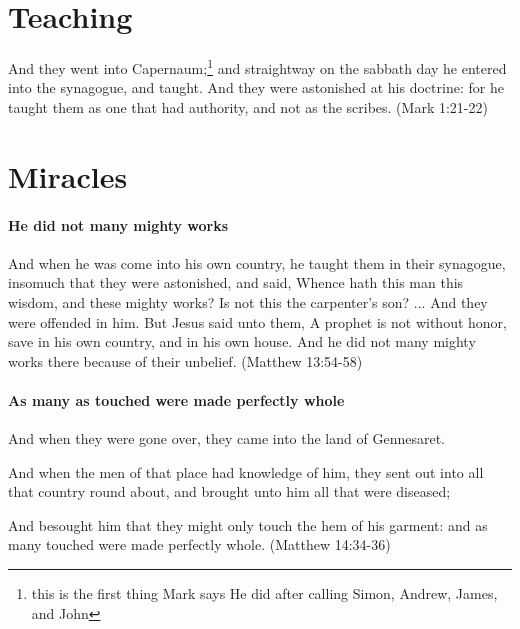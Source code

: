 \section{Teaching}
And they went into Capernaum;\footnote{this is the first thing Mark says He did after calling Simon, Andrew, James, and John} and straightway on the sabbath day he entered into the synagogue, and taught. And they were astonished at his doctrine: for he taught them as one that had authority, and not as the scribes. (Mark 1:21-22)

\section{Miracles}

\paragraph{He did not many mighty works}
And when he was come into his own country, he taught them in their synagogue, insomuch that they were astonished, and said, Whence hath this man this wisdom, and these mighty works? Is not this the carpenter's son? ... And they were offended in him. But Jesus said unto them, A prophet is not without honor, save in his own country, and in his own house. And he did not many mighty works there because of their unbelief. (Matthew 13:54-58)

\paragraph{As many as touched were made perfectly whole}
And when they were gone over, they came into the land of Gennesaret.

And when the men of that place had knowledge of him, they sent out into all that country round about, and brought unto him all that were diseased; 

And besought him that they might only touch the hem of his garment: and as many touched were made perfectly whole. (Matthew 14:34-36)
